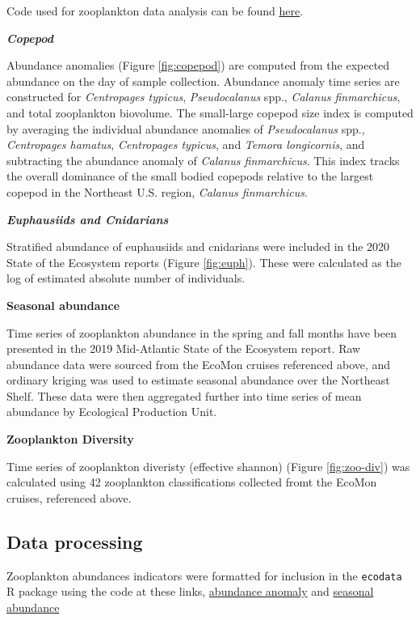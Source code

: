 \documentclass[
]{book}
\begin{document}
Code used for zooplankton data analysis can be found \href{https://github.com/NOAA-EDAB/tech-doc/blob/master/R/stored_scripts/zooplankton_analysis.R}{here}.

\textbf{\emph{Copepod}}

Abundance anomalies (Figure \ref{fig:copepod}) are computed from the expected abundance on the day of sample collection. Abundance anomaly time series are constructed for \emph{Centropages typicus}, \emph{Pseudocalanus} spp., \emph{Calanus finmarchicus}, and total zooplankton biovolume. The small-large copepod size index is computed by averaging the individual abundance anomalies of \emph{Pseudocalanus} spp., \emph{Centropages hamatus}, \emph{Centropages typicus}, and \emph{Temora longicornis}, and subtracting the abundance anomaly of \emph{Calanus finmarchicus}. This index tracks the overall dominance of the small bodied copepods relative to the largest copepod in the Northeast U.S. region, \emph{Calanus finmarchicus}.

\textbf{\emph{Euphausiids and Cnidarians}}

Stratified abundance of euphausiids and cnidarians were included in the 2020 State of the Ecosystem reports (Figure \ref{fig:euph}). These were calculated as the log of estimated absolute number of individuals.

\textbf{Seasonal abundance}

Time series of zooplankton abundance in the spring and fall months have been presented in the 2019 Mid-Atlantic State of the Ecosystem report. Raw abundance data were sourced from the EcoMon cruises referenced above, and ordinary kriging was used to estimate seasonal abundance over the Northeast Shelf. These data were then aggregated further into time series of mean abundance by Ecological Production Unit.

\textbf{Zooplankton Diversity}

Time series of zooplankton diveristy (effective shannon) (Figure \ref{fig:zoo-div}) was calculated using 42 zooplankton classifications collected fromt the EcoMon cruises, referenced above.

\hypertarget{data-processing-31}{%
\subsection{Data processing}\label{data-processing-31}}

Zooplankton abundances indicators were formatted for inclusion in the \texttt{ecodata} R package using the code at these links, \href{https://github.com/NOAA-EDAB/ecodata/blob/master/data-raw/get_zoo_abun_anom.R}{abundance anomaly} and \href{https://github.com/NOAA-EDAB/ecodata/blob/master/data-raw/get_zoo_oi.R}{seasonal abundance}
\end{document}
